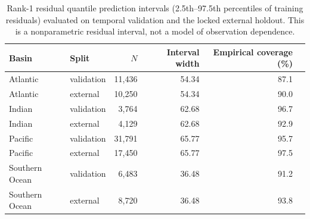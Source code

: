 \begin{table}[htbp]
\centering
\caption{Rank-1 residual quantile prediction intervals (2.5th--97.5th percentiles of training residuals) evaluated on temporal validation and the locked external holdout. This is a nonparametric residual interval, not a model of observation dependence.}
\label{tab:pi}
\small
\begin{tabular}{llrrrr}
\toprule
Basin & Split & $N$ & Interval width & Empirical coverage (\%) \\
\midrule
Atlantic & validation & 11,436 & 54.34 & 87.1 \\
Atlantic & external & 10,250 & 54.34 & 90.0 \\
Indian & validation & 3,764 & 62.68 & 96.7 \\
Indian & external & 4,129 & 62.68 & 92.9 \\
Pacific & validation & 31,791 & 65.77 & 95.7 \\
Pacific & external & 17,450 & 65.77 & 97.5 \\
Southern Ocean & validation & 6,483 & 36.48 & 91.2 \\
Southern Ocean & external & 8,720 & 36.48 & 93.8 \\
\bottomrule
\end{tabular}
\end{table}
